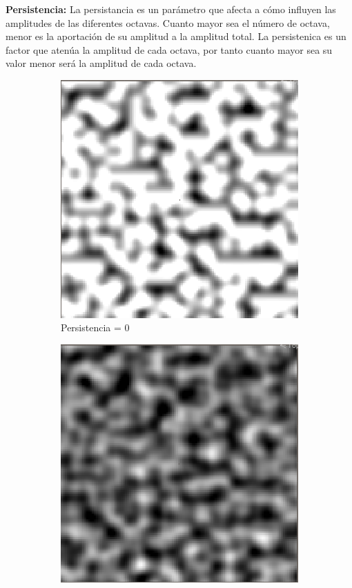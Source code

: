 \textbf{Persistencia: } La persistancia es un parámetro que afecta a cómo influyen las amplitudes de las diferentes octavas. Cuanto mayor sea el número de octava, menor es la aportación de su amplitud a la amplitud total. La persistenica es un factor que atenúa la amplitud de cada octava, por tanto cuanto mayor sea su valor menor será la amplitud de cada octava.
\begin{figure}[ht]
    \begin{subfigure}{0.3\linewidth}
        \centering
        \includegraphics[width=\linewidth]{img/LowPers.png}
        \caption{Persistencia = 0 }
    \end{subfigure}
    \hfill
    \begin{subfigure}{0.3\linewidth}
        \centering
        \includegraphics[width=\linewidth]{img/MediumPers.png}

\end{subfigure}
\end{figure}
